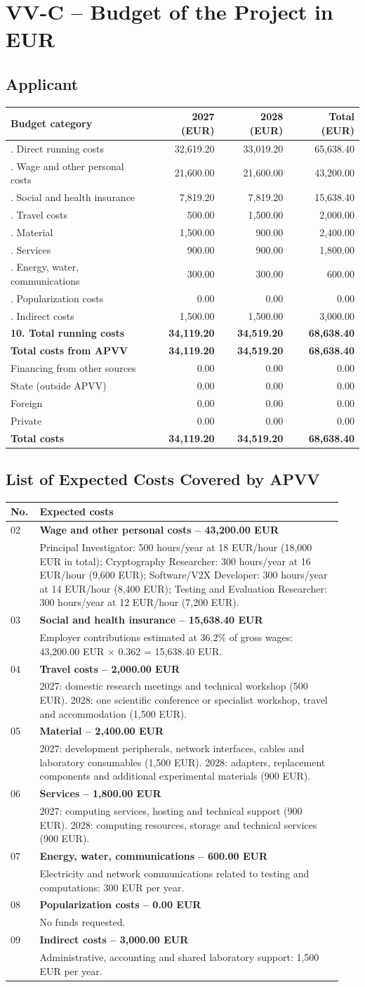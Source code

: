 \documentclass[11pt, a4paper]{article}
\makeatletter
\newcommand{\budgettable}{%
\small
\begin{tabularx}{\linewidth}{@{}>{\raggedright\arraybackslash}Xrrr@{}}
\toprule
\textbf{Budget category} & \textbf{2027 (EUR)} & \textbf{2028 (EUR)} & \textbf{Total (EUR)}\\
\midrule
01. Direct running costs & 32,619.20 & 33,019.20 & 65,638.40\\
\quad 02. Wage and other personal costs & 21,600.00 & 21,600.00 & 43,200.00\\
\quad 03. Social and health insurance & 7,819.20 & 7,819.20 & 15,638.40\\
\quad 04. Travel costs & 500.00 & 1,500.00 & 2,000.00\\
\quad 05. Material & 1,500.00 & 900.00 & 2,400.00\\
\quad 06. Services & 900.00 & 900.00 & 1,800.00\\
\quad 07. Energy, water, communications & 300.00 & 300.00 & 600.00\\
\quad 08. Popularization costs & 0.00 & 0.00 & 0.00\\
09. Indirect costs & 1,500.00 & 1,500.00 & 3,000.00\\
\midrule
\textbf{10. Total running costs} & \textbf{34,119.20} & \textbf{34,519.20} & \textbf{68,638.40}\\
\textbf{Total costs from APVV} & \textbf{34,119.20} & \textbf{34,519.20} & \textbf{68,638.40}\\
Financing from other sources & 0.00 & 0.00 & 0.00\\
\quad State (outside APVV) & 0.00 & 0.00 & 0.00\\
\quad Foreign & 0.00 & 0.00 & 0.00\\
\quad Private & 0.00 & 0.00 & 0.00\\
\textbf{Total costs} & \textbf{34,119.20} & \textbf{34,519.20} & \textbf{68,638.40}\\
\bottomrule
\end{tabularx}
\normalsize}
\makeatother
\begin{document}
\clearpage
\section*{VV-C -- Budget of the Project in EUR}
\subsection*{Applicant}
\budgettable

\subsection*{List of Expected Costs Covered by APVV}
\small
\begin{longtable}{@{}p{0.08\linewidth}p{0.86\linewidth}@{}}
\toprule
\textbf{No.} & \textbf{Expected costs}\\
\midrule
\endhead
02 & \textbf{Wage and other personal costs -- 43,200.00 EUR}\\
& Principal Investigator: 500 hours/year at 18 EUR/hour (18,000 EUR in total); Cryptography Researcher: 300 hours/year at 16 EUR/hour (9,600 EUR); Software/V2X Developer: 300 hours/year at 14 EUR/hour (8,400 EUR); Testing and Evaluation Researcher: 300 hours/year at 12 EUR/hour (7,200 EUR).\\[4pt]
03 & \textbf{Social and health insurance -- 15,638.40 EUR}\\
& Employer contributions estimated at 36.2\% of gross wages: 43,200.00 EUR $\times$ 0.362 = 15,638.40 EUR.\\[4pt]
04 & \textbf{Travel costs -- 2,000.00 EUR}\\
& 2027: domestic research meetings and technical workshop (500 EUR). 2028: one scientific conference or specialist workshop, travel and accommodation (1,500 EUR).\\[4pt]
05 & \textbf{Material -- 2,400.00 EUR}\\
& 2027: development peripherals, network interfaces, cables and laboratory consumables (1,500 EUR). 2028: adapters, replacement components and additional experimental materials (900 EUR).\\[4pt]
06 & \textbf{Services -- 1,800.00 EUR}\\
& 2027: computing services, hosting and technical support (900 EUR). 2028: computing resources, storage and technical services (900 EUR).\\[4pt]
07 & \textbf{Energy, water, communications -- 600.00 EUR}\\
& Electricity and network communications related to testing and computations: 300 EUR per year.\\[4pt]
08 & \textbf{Popularization costs -- 0.00 EUR}\\
& No funds requested.\\[4pt]
09 & \textbf{Indirect costs -- 3,000.00 EUR}\\
& Administrative, accounting and shared laboratory support: 1,500 EUR per year.\\
\bottomrule
\end{longtable}
\normalsize
\end{document}
